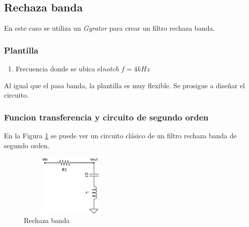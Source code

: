 


\subsection{Rechaza banda}

En este caso se utiliza un \textit{Gyrator} para crear un filtro rechaza banda. 

\subsubsection{Plantilla}

\begin{enumerate}
\item Frecuencia donde se ubica el\textit{notch} $f = 4kHz$	
\end{enumerate}

Al igual que el pasa banda, la plantilla es muy flexible. Se prosigue a diseñar el circuito. 

\subsubsection{Funcion transferencia y circuito de segundo orden}

En la Figura \ref{ej2_filto_BR} se puede ver un circuito clásico de un filtro rechaza banda de segundo orden. 

\begin{figure}[h!]                                                       
\centering\includegraphics[width=5cm, height=3cm]{../Ex2/Resources/ej2_br.png}
\caption{Rechaza banda}
\label{ej2_filto_BR}
\end{figure}


